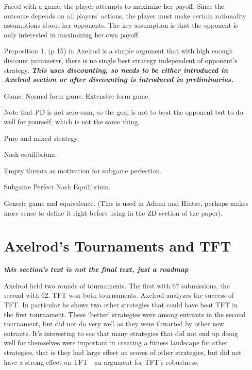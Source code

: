 Faced with a game, the player attempts to maximize her payoff. Since the outcome depends on all players' actions, the player must make certain rationality assumptions about her opponents. The key assumption is that the opponent is only interested in maximizing her own payoff.





Proposition 1, (p 15) in Axelrod is a simple argument that with high enough discount parameter, there is no single best strategy independent of opponent's strategy. \textit{\textbf{This uses discounting, so needs to be either introduced in Axelrod section or after discounting is introduced in preliminaries.}}


\begin{definition}Game. Normal form game. Extensive form game.
\end{definition}

Note that PD is not zero-sum, so the goal is not to beat the opponent but to do well for yourself, which is not the same thing.

\begin{definition}Pure and mixed strategy.
\end{definition}

\begin{definition}Nash equilibrium.
\end{definition}

Empty threats as motivation for subgame perfection.

\begin{definition}Subgame Perfect Nash Equilibrium.
\end{definition}


\begin{definition}
Generic game and equivalence. (This is used in Adami and Hintze, perhaps makes more sense to define it right before using in the ZD section of the paper).
\end{definition}

\chapter{Axelrod's Tournaments and TFT}

\textit{\textbf{this section's text is not the final text, just a roadmap}}

Axelrod held two rounds of tournaments. The first with 6? submissions, the second with 62. TFT won both tournaments. Axelrod analyzes the success of TFT. In particular he shows two other strategies that could have beat TFT in the first tournament. These `better' strategies were among entrants in the second tournament, but did not do very well as they were thwarted by other new entrants. It's interesting to see that many strategies that did not end up doing well for themselves were important in creating a fitness landscape for other strategies, that is they had large effect on scores of other strategies, but did not have a strong effect on TFT - an argument for TFT's robustness.


